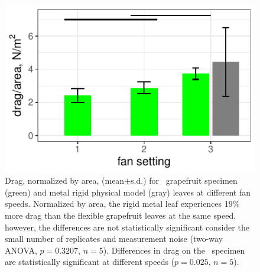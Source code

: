 \begin{figure}[p]
\begin{center}
\includegraphics{data/results2.pdf}
%
\end{center}
\caption{Drag, normalized by area, (mean$\pm$s.d.) for \Cxparadisi\ grapefruit specimen (green) and metal rigid physical model (gray) leaves at different fan speeds. Normalized by area, the rigid metal leaf experiences 19\% more drag than the flexible grapefruit leaves at the same speed, however, the differences are not statistically significant consider the small number of replicates and measurement noise (two-way ANOVA, $p=0.3207$, $n=5$). Differences in drag on the \Cxparadisi\ specimen are statistically significant at different speeds ($p=0.025$, $n=5$).}
\label{fig:results:dragarea}
\end{figure}

